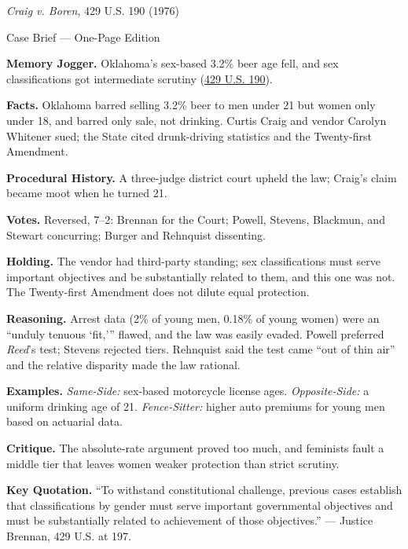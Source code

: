 \documentclass[12pt]{article}
\begin{document}
\begin{center}
{\Large \textit{Craig v. Boren}, 429 U.S. 190 (1976)\par}
\vspace{0.3em}
{\normalsize Case Brief --- One-Page Edition\par}
\end{center}

\textbf{Memory Jogger.} Oklahoma's sex-based 3.2\% beer age fell, and sex classifications got intermediate scrutiny (\href{https://supreme.justia.com/cases/federal/us/429/190/}{429 U.S. 190}).

\textbf{Facts.} Oklahoma barred selling 3.2\% beer to men under 21 but women only under 18, and barred only sale, not drinking. Curtis Craig and vendor Carolyn Whitener sued; the State cited drunk-driving statistics and the Twenty-first Amendment.

\textbf{Procedural History.} A three-judge district court upheld the law; Craig's claim became moot when he turned 21.

\textbf{Votes.} Reversed, 7--2: Brennan for the Court; Powell, Stevens, Blackmun, and Stewart concurring; Burger and Rehnquist dissenting.

\textbf{Holding.} The vendor had third-party standing; sex classifications must serve important objectives and be substantially related to them, and this one was not. The Twenty-first Amendment does not dilute equal protection.

\textbf{Reasoning.} Arrest data (2\% of young men, 0.18\% of young women) were an ``unduly tenuous `fit,''' flawed, and the law was easily evaded. Powell preferred \textit{Reed}'s test; Stevens rejected tiers. Rehnquist said the test came ``out of thin air'' and the relative disparity made the law rational.

\textbf{Examples.} \emph{Same-Side:} sex-based motorcycle license ages. \emph{Opposite-Side:} a uniform drinking age of 21. \emph{Fence-Sitter:} higher auto premiums for young men based on actuarial data.

\textbf{Critique.} The absolute-rate argument proved too much, and feminists fault a middle tier that leaves women weaker protection than strict scrutiny.

\textbf{Key Quotation.} ``To withstand constitutional challenge, previous cases establish that classifications by gender must serve important governmental objectives and must be substantially related to achievement of those objectives.'' --- Justice Brennan, 429 U.S. at 197.
\end{document}
